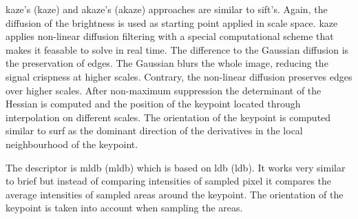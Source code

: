 \acrshort{kaze}'s\cite{alcantarilla_eccv12} (\acrlong{kaze}) and \acrshort{akaze}\cite{alcantarilla_bmva13}'s (\acrlong{akaze}) approaches are similar to \acrshort{sift}'s.
Again, the diffusion of the brightness is used as starting point applied in scale space.
\acrshort{kaze} applies non-linear diffusion filtering with a special computational scheme that makes it feasable to solve in real time.
The difference to the Gaussian diffusion is the preservation of edges.
The Gaussian blurs the whole image, reducing the signal crispness at higher scales.
Contrary, the non-linear diffusion preserves edges over higher scales.
After non-maximum suppression the determinant of the Hessian is computed and the position of the keypoint located through interpolation on different scales.
The orientation of the keypoint is computed similar to \acrshort{surf} as the dominant direction of the derivatives in the local neighbourhood of the keypoint.

The descriptor is \acrshort{mldb} (\acrlong{mldb}) which is based on \acrshort{ldb}\cite{yang_ismar12} (\acrlong{ldb}).
It works very similar to \acrshort{brief} but instead of comparing intensities of sampled pixel it compares the average intensities of sampled areas around the keypoint.
The orientation of the keypoint is taken into account when sampling the areas.
